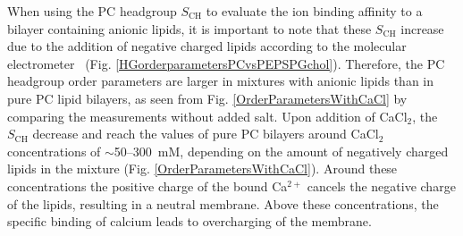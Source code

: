 \documentclass[journal=jpcbfk,manuscript=article]{achemso}
\begin{document}
When using the PC headgroup $S_\mathrm{CH}$ to evaluate the ion binding affinity to a bilayer containing anionic lipids,
it is important to note that these $S_\mathrm{CH}$
increase due to the addition of negative charged lipids according to the molecular electrometer~\cite{seelig87, scherer87}
(Fig. \ref{HGorderparametersPCvsPEPSPGchol}).
Therefore, the PC headgroup order parameters are larger in mixtures with anionic lipids
than in pure PC lipid bilayers, as seen from Fig. \ref{OrderParametersWithCaCl} by comparing the measurements without added salt.
Upon addition of CaCl$_2$, the $S_\mathrm{CH}$ decrease and reach the values of pure PC bilayers around 
CaCl$_2$ concentrations of $\sim$50--300~mM, depending on the amount of negatively charged
lipids in the mixture (Fig. \ref{OrderParametersWithCaCl}).
Around these concentrations the positive charge of the bound Ca$^{2+}$ cancels
the negative charge of the lipids, resulting in a neutral membrane. 
Above these concentrations, the specific binding of calcium leads to
overcharging of the membrane.
\end{document}
